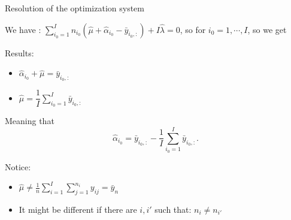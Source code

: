 \documentclass[unknownkeysallowed]{beamer}
\begin{document}
\begin{frame}{Resolution of the optimization system}

\vspace{0.5cm}
We have :  
$\sum\limits_{i_0 =1}^{I} n_{i_0}(\hat{\mu}+\hat{\alpha}_{i_0}-\bar{y}_{i_0,:}) +I\hat{\lambda}=0$, so for $i_0=1,\cdots,I$, so we get


\end{frame}




\begin{frame}

\begin{alertblock}{Results: }
    \begin{itemize}
        \item $\hat{\alpha}_{i_0} + \hat{\mu}= \bar{y}_{i_0,:}$
        \item $\hat{\mu}=\dfrac{1}{I}\sum\limits_{i_0=1}^{I} \bar{y}_{i_0,:}$
    \end{itemize}

Meaning that 
\[\hat{\alpha}_{i_0}=\bar{y}_{i_0,:}-\frac{1}{I} \sum\limits_{i_0=1}^{I} \bar{y}_{i_0,:}.\]

\end{alertblock}

\begin{alertblock}{Notice: }
    \begin{itemize}
        \item $ \hat{\mu} \ne \frac{1}{n}\sum\limits_{i=1}^{I}\sum\limits_{j=1}^{n_i}y_{ij}=\bar{y}_n$
        \item It might be different if there are $ i,i'$ such that: $n_i \ne n_{i'}$
    \end{itemize}


\end{alertblock}
\end{frame}
\end{document}

